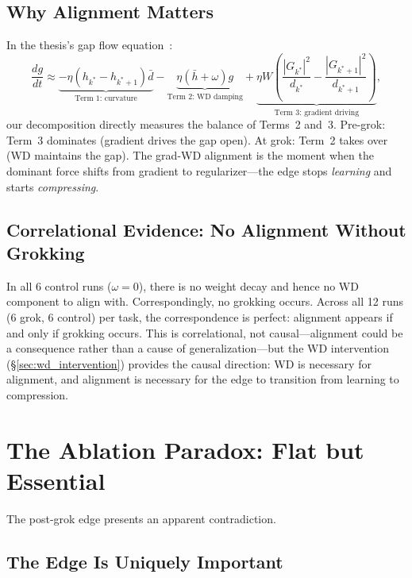 \documentclass[11pt]{article}
\begin{document}
\subsection{Why Alignment Matters}

In the thesis's gap flow equation~\citep{xu2026spectral_edge}:
\begin{equation}
\frac{dg}{dt} \approx \underbrace{-\eta(h_{k^*} - h_{k^*+1}) \bar{d}}_{\text{Term 1: curvature}} - \underbrace{\eta(\bar{h} + \omega) g}_{\text{Term 2: WD damping}} + \underbrace{\eta W \!\left(\frac{|G_{k^*}|^2}{d_{k^*}} - \frac{|G_{k^*+1}|^2}{d_{k^*+1}}\right)}_{\text{Term 3: gradient driving}},
\label{eq:gap_flow}
\end{equation}
our decomposition directly measures the balance of Terms~2 and~3.
Pre-grok: Term~3 dominates (gradient drives the gap open).
At grok: Term~2 takes over (WD maintains the gap).
The grad-WD alignment is the moment when the dominant force shifts from gradient to regularizer---the edge stops \emph{learning} and starts \emph{compressing}.

\subsection{Correlational Evidence: No Alignment Without Grokking}

In all 6 control runs ($\omega = 0$), there is no weight decay and hence no WD component to align with.
Correspondingly, no grokking occurs.
Across all 12 runs (6 grok, 6 control) per task, the correspondence is perfect: alignment appears if and only if grokking occurs.
This is correlational, not causal---alignment could be a consequence rather than a cause of generalization---but the WD intervention (\S\ref{sec:wd_intervention}) provides the causal direction: WD is necessary for alignment, and alignment is necessary for the edge to transition from learning to compression.


\section{The Ablation Paradox: Flat but Essential}
\label{sec:paradox}

The post-grok edge presents an apparent contradiction.

\subsection{The Edge Is Uniquely Important}
\end{document}
